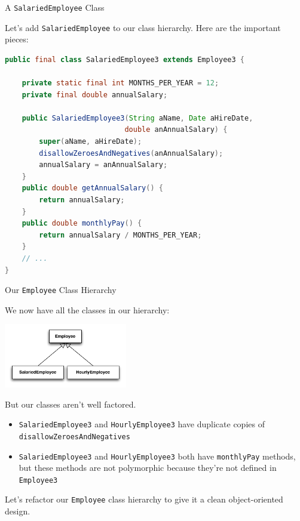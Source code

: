 \documentclass{beamer}
\begin{document}
\begin{frame}[fragile]{A {\tt SalariedEmployee} Class}


Let's add {\tt SalariedEmployee} to our class hierarchy.  Here are the important pieces:
\begin{lstlisting}[language=Java]
public final class SalariedEmployee3 extends Employee3 {

    private static final int MONTHS_PER_YEAR = 12;
    private final double annualSalary;

    public SalariedEmployee3(String aName, Date aHireDate,
                            double anAnnualSalary) {
        super(aName, aHireDate);
        disallowZeroesAndNegatives(anAnnualSalary);
        annualSalary = anAnnualSalary;
    }
    public double getAnnualSalary() {
        return annualSalary;
    }
    public double monthlyPay() {
        return annualSalary / MONTHS_PER_YEAR;
    }
    // ...
}
\end{lstlisting}

\end{frame}

\begin{frame}[fragile]{Our {\tt Employee} Class Hierarchy}


We now have all the classes in our hierarchy:
\vspace{-.1in}
\begin{center}
\includegraphics[height=1.1in]{employee-class-hierarchy.pdf}
\end{center}
\vspace{-.2in}
But our classes aren't well factored.
\begin{itemize}
\item {\tt SalariedEmployee3} and {\tt HourlyEmployee3} have duplicate copies of {\tt disallowZeroesAndNegatives}
\item {\tt SalariedEmployee3} and {\tt HourlyEmployee3} both have {\tt monthlyPay} methods, but these methods are not polymorphic because they're not defined in {\tt Employee3}
\end{itemize}

Let's refactor our {\tt Employee} class hierarchy to give it a clean object-oriented design.

\end{frame}
\end{document}
